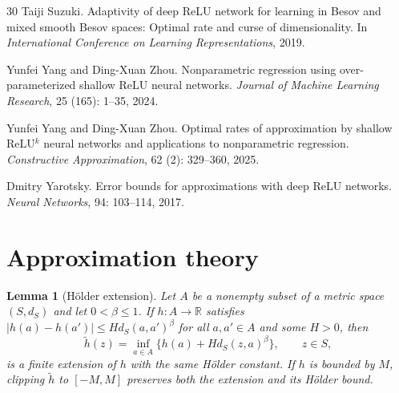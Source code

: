 \documentclass[11pt,a4paper]{article}
\newtheorem{lemma}{Lemma}
\theoremstyle{remark}
\newcommand{\abs}[1]{\lvert#1\rvert}
\begin{document}
\begin{thebibliography}{30}
Taiji Suzuki.
\newblock Adaptivity of deep {ReLU} network for learning in {Besov} and mixed
  smooth {Besov} spaces: Optimal rate and curse of dimensionality.
\newblock In \emph{International Conference on Learning Representations}, 2019.

Yunfei Yang and Ding-Xuan Zhou.
\newblock Nonparametric regression using over-parameterized shallow {ReLU}
  neural networks.
\newblock \emph{Journal of Machine Learning Research}, 25
  (165): 1--35, 2024.

Yunfei Yang and Ding-Xuan Zhou.
\newblock Optimal rates of approximation by shallow {ReLU}$^k$ neural networks
  and applications to nonparametric regression.
\newblock \emph{Constructive Approximation}, 62 (2):
  329--360, 2025.

Dmitry Yarotsky.
\newblock Error bounds for approximations with deep {ReLU} networks.
\newblock \emph{Neural Networks}, 94: 103--114, 2017.

\end{thebibliography}

\clearpage
\appendix
\section{Approximation theory}\label{app:approx}

\begin{lemma}[H\"older extension]\label{lem:extension}
Let $A$ be a nonempty subset of a metric space $(S,d_S)$ and let
$0<\beta\leq1$. If $h:A\to\mathbb R$ satisfies
$\abs{h(a)-h(a')}\leq H d_S(a,a')^\beta$ for all $a,a'\in A$
and some $H>0$, then
\begin{equation}\label{eq:extension}
\widetilde h(z)=\inf_{a\in A}\{h(a)+H d_S(z,a)^\beta\},
\qquad z\in S,
\end{equation}
is a finite extension of $h$ with the same H\"older constant. If $h$ is
bounded by $M$, clipping $\widetilde h$ to $[-M,M]$ preserves both the
extension and its H\"older bound.
\end{lemma}
\end{document}
